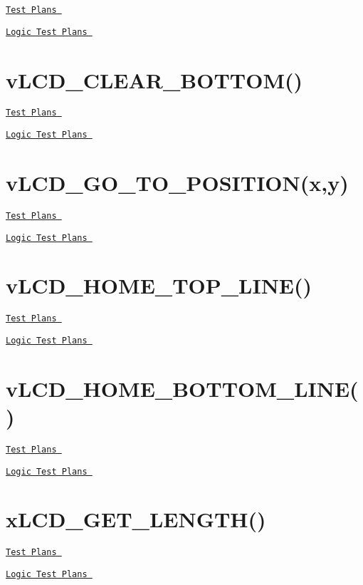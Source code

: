 \href{vLCD_CLEAR_TOP_TESTPLAN.pdf}{\tt Test Plans } \par
 \href{vLCD_CLEAR_TOP_LOGIC.pdf}{\tt Logic Test Plans }\hypertarget{_test_plans_clear_bottom}{}\section{v\-L\-C\-D\-\_\-\-C\-L\-E\-A\-R\-\_\-\-B\-O\-T\-T\-O\-M()}\label{_test_plans_clear_bottom}
\href{vLCD_CLEAR_BOTTOM_TESTPLAN.pdf}{\tt Test Plans } \par
 \href{vLCD_CLEAR_BOTTOM_LOGIC.pdf}{\tt Logic Test Plans }\hypertarget{_test_plans_position}{}\section{v\-L\-C\-D\-\_\-\-G\-O\-\_\-\-T\-O\-\_\-\-P\-O\-S\-I\-T\-I\-O\-N(x,y)}\label{_test_plans_position}
\href{vLCD_GO_TO_POSITION_TESTPLAN.pdf}{\tt Test Plans } \par
 \href{vLCD_GO_TO_POSITION_LOGIC.pdf}{\tt Logic Test Plans }\hypertarget{_test_plans_tophome}{}\section{v\-L\-C\-D\-\_\-\-H\-O\-M\-E\-\_\-\-T\-O\-P\-\_\-\-L\-I\-N\-E()}\label{_test_plans_tophome}
\href{vLCD_HOME_TOP_LINE_TESTPLAN.pdf}{\tt Test Plans } \par
 \href{vLCD_HOME_TOP_LINE_LOGIC.pdf}{\tt Logic Test Plans }\hypertarget{_test_plans_bottomhome}{}\section{v\-L\-C\-D\-\_\-\-H\-O\-M\-E\-\_\-\-B\-O\-T\-T\-O\-M\-\_\-\-L\-I\-N\-E()}\label{_test_plans_bottomhome}
\href{vLCD_HOME_BOTTOM_LINE_TESTPLAN.pdf}{\tt Test Plans } \par
 \href{vLCD_HOME_BOTTOM_LINE_LOGIC.pdf}{\tt Logic Test Plans }\hypertarget{_test_plans_getlength}{}\section{x\-L\-C\-D\-\_\-\-G\-E\-T\-\_\-\-L\-E\-N\-G\-T\-H()}\label{_test_plans_getlength}
\href{vLCD_PRINT_STRING_TESTPLAN.pdf}{\tt Test Plans } \par
 \href{vLCD_PRINT_STRING_LOGIC.pdf}{\tt Logic Test Plans } 